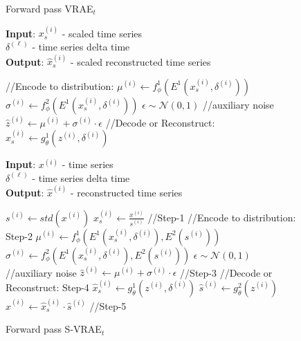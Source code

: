 \begin{figure}[t!]
\begin{minipage}[t]{0.48\textwidth}
\centering
\begin{algorithm}[H] 
\caption{Forward pass VRAE$_t$}
\label{alg:vrae}
\hspace*{\algorithmicindent} \textbf{Input}: $x_s^{(i)}$ - scaled time series\\ %
\hspace*{\algorithmicindent} \hspace{0.18\textwidth} $\delta^{(\ell)}$ - time series delta time  \\
\hspace*{\algorithmicindent} \textbf{Output}:  $\hat{x}_s^{(i)}$ - scaled reconstructed time series
\begin{algorithmic}[1]
\State //Encode to distribution:%
\State  $\mu^{(i)} \gets f_{\phi}^1\left( E^1(x_s^{(i)}, \delta^{(i)}) \right)$
\State $\sigma^{(i)} \gets f_{\phi}^2\left( E^1(x_s^{(i)}, \delta^{(i)}) \right)$
\State $\epsilon\sim \mathcal{N}(0,1)$ //auxiliary noise
\State $\hat{z}^{(i)} \gets \mu^{(i)} + \sigma^{(i)} \cdot \epsilon$
\State //Decode or Reconstruct:
\State $\hat{x}_s^{(i)} \gets g_{\theta}^1\left( z^{(i)}, \delta^{(i)} \right)$
\end{algorithmic} 
\end{algorithm}
\end{minipage}
\hfill
\begin{minipage}[t]{0.48\textwidth}
\centering
\begin{algorithm}[H] 
\caption{Forward pass S-VRAE$_t$}
\label{alg:s-vrae}
\hspace*{\algorithmicindent} \textbf{Input}: $x^{(i)}$ - time series\\ %
\hspace*{\algorithmicindent} \hspace{0.18\textwidth} $\delta^{(\ell)}$ - time series delta time \\
\hspace*{\algorithmicindent} \textbf{Output}:  $\hat{x}^{(i)}$ - reconstructed time series
\begin{algorithmic}[1]
\State $s^{(i)} \gets std(x^{(i)})$
\State  $x_s^{(i)} \gets \frac{x^{(i)}}{s^{(i)}}$ //Step-1
\State //Encode to distribution: Step-2 %
\State  $\mu^{(i)} \gets f_{\phi}^1\left( E^1(x_s^{(i)}, \delta^{(i)}), E^2(s^{(i)}) \right)$
\State $\sigma^{(i)} \gets f_{\phi}^2\left( E^1(x_s^{(i)}, \delta^{(i)}), E^2(s^{(i)}) \right)$
\State $\epsilon\sim \mathcal{N}(0,1)$ //auxiliary noise
\State $\hat{z}^{(i)} \gets \mu^{(i)} + \sigma^{(i)} \cdot \epsilon$ //Step-3
\State //Decode or Reconstruct: Step-4
\State $\hat{x}_s^{(i)} \gets g_{\theta}^1\left( z^{(i)}, \delta^{(i)} \right)$
\State $\hat{s}^{(i)} \gets g_{\theta}^2\left( z^{(i)} \right)$
\State $\hat{x}^{(i)} \gets \hat{x}_s^{(i)} \cdot \hat{s}^{(i)}$ //Step-5
\end{algorithmic} 
\end{algorithm}
\end{minipage}
\end{figure}
